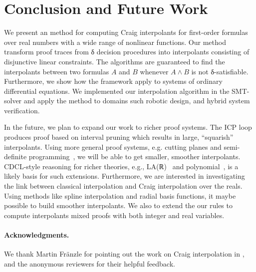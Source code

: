 \section{Conclusion and Future Work}
\label{sec:concl}

We present an method for computing Craig interpolants for first-order formulas over real numbers with a wide range of nonlinear functions.
Our method transform proof traces from δ decision procedures into interpolants consisting of disjunctive linear constraints.
The algorithms are guaranteed to find the interpolants between two formulas $A$ and $B$ whenever $A ∧ B$ is not δ-satisfiable.
Furthermore, we show how the framework apply to systems of ordinary differential equations.
We implemented our interpolation algorithm in the \dReal SMT-solver and apply the method to domains such robotic design, and hybrid system verification.  

In the future, we plan to expand our work to richer proof systems.
The ICP loop produces proof based on interval pruning which results in large, ``squarish'' interpolants.
Using more general proof systems, e.g. cutting planes and semi-definite programming~\cite{DBLP:conf/cav/DaiXZ13}, we will be able to get smaller, smoother interpolants.
CDCL-style reasoning for richer theories, e.g., LA(ℝ)~\cite{DBLP:conf/cav/McMillanKS09} and polynomial~\cite{DBLP:conf/cade/JovanovicM12}, is a likely basis for such extensions.
Furthermore, we are interested in investigating the link between classical interpolation and Craig interpolation over the reals.
Using methods like spline interpolation and radial basis functions, it maybe possible to build smoother interpolants.
We also to extend the our rules to compute interpolants mixed proofs with both integer and real variables.

\paragraph{Acknowledgments.}
We thank Martin Fr\"anzle for pointing out the work on Craig interpolation in \iSat, and the anonymous reviewers for their helpful feedback.

